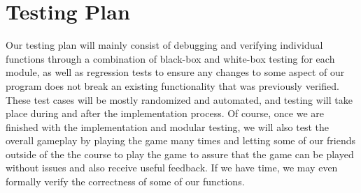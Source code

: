 \documentclass{scrreprt}
\begin{document}
\section{Testing Plan}
Our testing plan will mainly consist of debugging and verifying individual functions through a combination of black-box and white-box testing for each module, as well as regression tests to ensure any changes to some aspect of our program does not break an existing functionality that was previously verified. These test cases will be mostly randomized and automated, and testing will take place during and after the implementation process. Of course, once we are finished with the implementation and modular testing, we will also test the overall gameplay by playing the game many times and letting some of our friends outside of the the course to play the game to assure that the game can be played without issues and also receive useful feedback. If we have time, we may even formally verify the correctness of some of our functions. 

\end{document}
